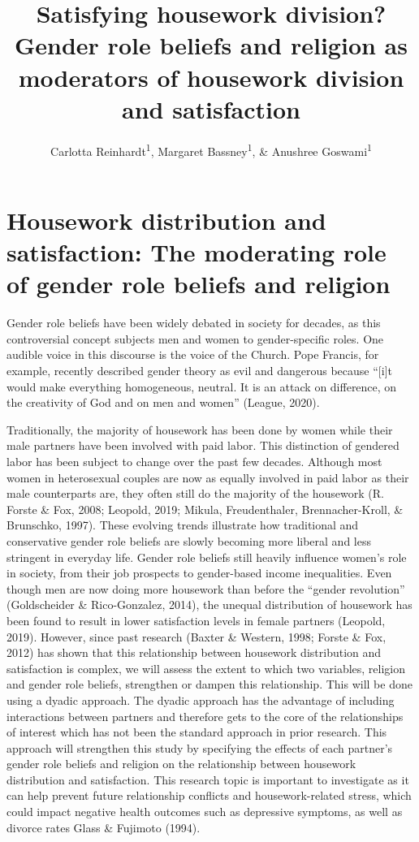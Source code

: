 \documentclass[
  man,floatsintext]{apa6}
\title{Satisfying housework division? Gender role beliefs and religion as moderators of housework division and satisfaction}
\author{Carlotta Reinhardt\textsuperscript{1}, Margaret Bassney\textsuperscript{1}, \& Anushree Goswami\textsuperscript{1}}
\date{}
\affiliation{\vspace{0.5cm}\textsuperscript{1} Smith College}
\begin{document}
\maketitle

\hypertarget{housework-distribution-and-satisfaction-the-moderating-role-of-gender-role-beliefs-and-religion}{%
\section{Housework distribution and satisfaction: The moderating role of gender role beliefs and religion}\label{housework-distribution-and-satisfaction-the-moderating-role-of-gender-role-beliefs-and-religion}}

Gender role beliefs have been widely debated in society for decades, as this controversial concept subjects men and women to gender-specific roles. One audible voice in this discourse is the voice of the Church. Pope Francis, for example, recently described gender theory as evil and dangerous because ``{[}i{]}t would make everything homogeneous, neutral. It is an attack on difference, on the creativity of God and on men and women'' (League, 2020).

Traditionally, the majority of housework has been done by women while their male partners have been involved with paid labor. This distinction of gendered labor has been subject to change over the past few decades. Although most women in heterosexual couples are now as equally involved in paid labor as their male counterparts are, they often still do the majority of the housework (R. Forste \& Fox, 2008; Leopold, 2019; Mikula, Freudenthaler, Brennacher-Kroll, \& Brunschko, 1997). These evolving trends illustrate how traditional and conservative gender role beliefs are slowly becoming more liberal and less stringent in everyday life. Gender role beliefs still heavily influence women's role in society, from their job prospects to gender-based income inequalities. Even though men are now doing more housework than before the ``gender revolution'' (Goldscheider \& Rico-Gonzalez, 2014), the unequal distribution of housework has been found to result in lower satisfaction levels in female partners (Leopold, 2019). However, since past research (Baxter \& Western, 1998; Forste \& Fox, 2012) has shown that this relationship between housework distribution and satisfaction is complex, we will assess the extent to which two variables, religion and gender role beliefs, strengthen or dampen this relationship.
This will be done using a dyadic approach. The dyadic approach has the advantage of including interactions between partners and therefore gets to the core of the relationships of interest which has not been the standard approach in prior research. This approach will strengthen this study by specifying the effects of each partner's gender role beliefs and religion on the relationship between housework distribution and satisfaction.
This research topic is important to investigate as it can help prevent future relationship conflicts and housework-related stress, which could impact negative health outcomes such as depressive symptoms, as well as divorce rates Glass \& Fujimoto (1994).
\end{document}

